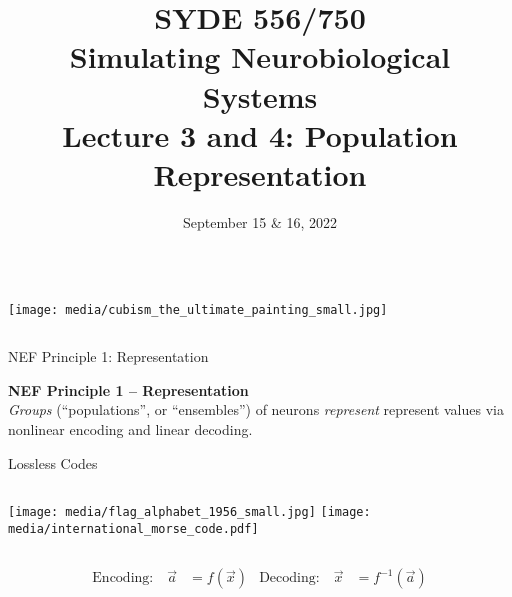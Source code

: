 \documentclass[handout,aspectratio=169]{beamer}
\date{September 15 \& 16, 2022}
\title{SYDE 556/750 \\ Simulating Neurobiological Systems \\ Lecture 3 and 4: Population Representation}
\begin{document}
	
\begin{frame}{}
	\vspace{0.5cm}
	\begin{columns}[c]
		\MakeTitle
		\texttt{[image: media/cubism\_the\_ultimate\_painting\_small.jpg]}
	\end{columns}
\end{frame}



\begin{frame}{NEF Principle 1: Representation}
	\begin{mdframed}
		\textbf{NEF Principle 1 -- Representation}\\
		\emph{Groups} (\enquote{populations}, or \enquote{ensembles}) of neurons \emph{represent} represent values via nonlinear encoding and linear decoding.
	\end{mdframed}
\end{frame}

\begin{frame}{Lossless Codes}
	\vspace{0.5cm}
	\begin{columns}
		\texttt{[image: media/flag\_alphabet\_1956\_small.jpg]}
		\texttt{[image: media/international\_morse\_code.pdf]}
	\end{columns}
	\vspace{0.25cm}
	\begin{align*}
		\text{Encoding:} \quad \vec a &= f(\vec x) & \text{Decoding:} \quad \vec x &= f^{-1}(\vec a)
	\end{align*}
\end{frame}
\end{document}
